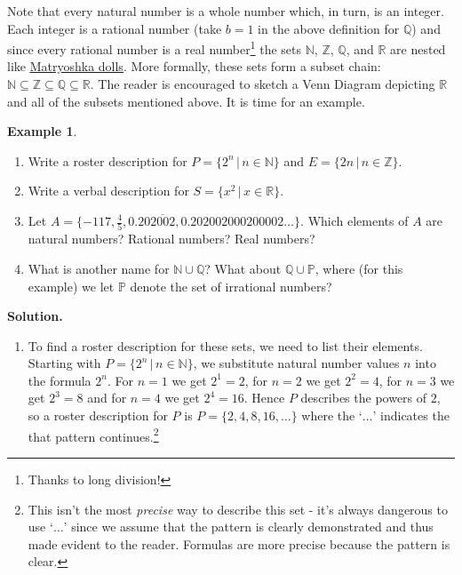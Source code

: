 \documentclass[11pt]{article}
\theoremstyle{definition}  %
\newtheorem{ex}{\bf Example}
\begin{document}
\medskip

Note that every natural number is a whole number which, in turn, is an integer.   Each integer is a rational number (take $b =1$ in the above definition for $\mathbb{Q}$) and since every rational number is a real number\footnote{Thanks to long division!}  the sets $\mathbb{N}$,   $\mathbb Z$, $\mathbb{Q}$, and  $\mathbb{R}$ are nested like \href{http://en.wikipedia.org/wiki/Matryoshka_doll}{\underline{Matryoshka dolls}}. More formally, these sets form a subset chain:  $\mathbb{N} \subseteq \mathbb Z \subseteq \mathbb{Q} \subseteq \mathbb{R}$.  The reader is encouraged to sketch a Venn Diagram depicting $\mathbb{R}$ and all of the subsets mentioned above.  It is time for an example.

\begin{ex} \label{numbersetex}   $~$

\begin{enumerate}

\item  Write a roster description for $P = \{ 2^{n} \, | \, n \in \mathbb{N} \}$  and $E = \{ 2n \, | \, n \in \mathbb Z \}$.

\item Write a verbal description for $S = \{ x^2 \, | \, x \in \mathbb{R} \}$.

\item Let $A = \{-117, \frac{4}{5}, 0.20\overline{2002}, 0.202002000200002 \ldots\}$. 
Which elements of $A$ are natural numbers?  Rational numbers?  Real numbers?

\item  What is another name for $\mathbb{N} \cup \mathbb{Q}$?  What about  $\mathbb{Q} \cup \mathbb P$, where (for this example) we let $\mathbb{P}$ denote the set of irrational numbers?

\end{enumerate}

{\bf Solution.}

\begin{enumerate}

\item  To find a roster description for these sets, we need to list their elements.   Starting with $P = \{ 2^{n} \, | \, n \in \mathbb{N} \}$, we substitute natural number values $n$ into the formula $2^n$.  For $n = 1$ we get $2^1 = 2$,  for $n = 2$ we get $2^2 = 4$, for $n = 3$ we get $2^3 = 8$ and for $n = 4$ we get $2^4 = 16$.  Hence  $P$ describes the powers of $2$, so a roster description for $P$ is $P = \{ 2, 4, 8, 16, \ldots \}$ where the `$\ldots$' indicates the that pattern continues.\footnote{This isn't the most \textit{precise} way to describe this set - it's always dangerous to use `$\ldots$' since we assume that the pattern is clearly demonstrated and thus made evident to the reader.  Formulas are more precise because the pattern is clear.}  


\end{enumerate}
\end{ex}
\end{document}
